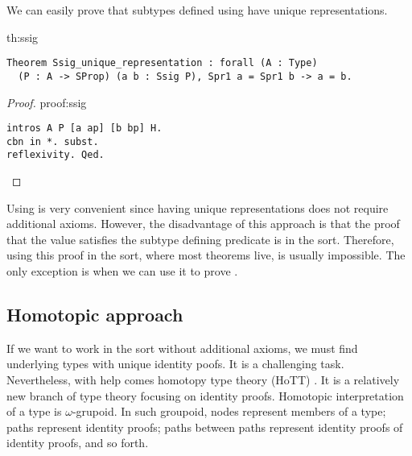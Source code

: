 We can easily prove that subtypes defined using  have unique representations.
\begin{theo}{}{th:ssig}
\begin{verbatim}
Theorem Ssig_unique_representation : forall (A : Type) 
  (P : A -> SProp) (a b : Ssig P), Spr1 a = Spr1 b -> a = b.
\end{verbatim}
\end{theo}
\begin{proof}{}{proof:ssig}
\begin{verbatim}
intros A P [a ap] [b bp] H.
cbn in *. subst.
reflexivity. Qed.
\end{verbatim}
\end{proof}
Using  is very convenient since having unique representations does not require additional axioms. However, the disadvantage of this approach is that the proof that the value satisfies the subtype defining predicate is in the  sort. Therefore, using this proof in the  sort, where most theorems live, is usually impossible. The only exception is when we can use it to prove .
\subsection{Homotopic approach}
If we want to work in the  sort without additional axioms, we must find underlying types with unique identity poofs. It is a challenging task. Nevertheless, with help comes homotopy type theory (HoTT) \cite{HoTT}. It is a relatively new branch of type theory focusing on identity proofs. Homotopic interpretation of a type is $\omega$-grupoid. In such groupoid, nodes represent members of a type; paths represent identity proofs; paths between paths represent identity proofs of identity proofs, and so forth. 
